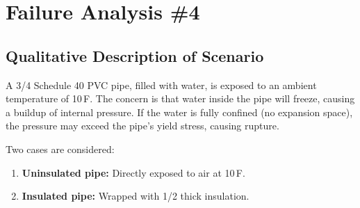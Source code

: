 \documentclass[12pt]{report}
\begin{document}
\section{Failure Analysis \#4}
\subsection{Qualitative Description of Scenario}
A 3/4 Schedule 40 PVC pipe, filled with water, is exposed to an ambient temperature of 10\,\textdegree F. The concern is that water inside the pipe will freeze, causing a buildup of internal pressure. If the water is fully confined (no expansion space), the pressure may exceed the pipe's yield stress, causing rupture.

Two cases are considered:
\begin{enumerate}
    \item \textbf{Uninsulated pipe:} Directly exposed to air at 10\,\textdegree F.
    \item \textbf{Insulated pipe:} Wrapped with 1/2\textquotedbl{} thick insulation.
\end{enumerate}
\end{document}
